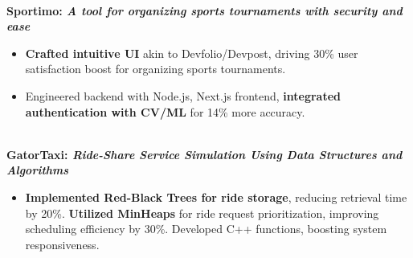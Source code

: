 \documentclass[a4paper,10pt]{article}
\begin{document}
\vspace{-8pt}
\textbf{\\Sportimo: \textit{A tool for organizing sports tournaments with security and ease}}

\begin{itemize}
    \item \textbf{Crafted intuitive UI} akin to Devfolio/Devpost, driving 30\% user satisfaction boost for organizing sports tournaments.
    \item Engineered backend with Node.js, Next.js frontend, \textbf{integrated authentication with CV/ML} for 14\% more accuracy.
\end{itemize}

\vspace{-8pt}

\textbf{\\ GatorTaxi: \textit{Ride-Share Service Simulation Using Data Structures and Algorithms}}
\begin{itemize}
    \item \textbf{Implemented Red-Black Trees for ride storage}, reducing retrieval time by 20\%. \textbf{Utilized MinHeaps} for ride request prioritization, improving scheduling efficiency by 30\%. Developed C++ functions, boosting system responsiveness.

\end{itemize}
\end{document}
